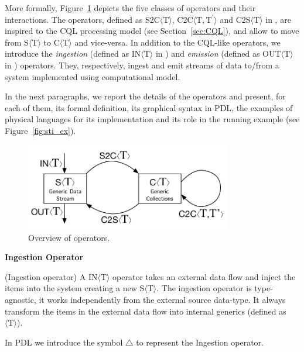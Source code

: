 More formally, Figure~\ref{fig:cm-op} depicts the five classes of \river{} operators and their interactions. 
The operators, defined as S2C$\langle\mathrm{T}\rangle$, C2C$\langle\mathrm{T},\mathrm{T^{\prime}}\rangle$ and C2S$\langle\mathrm{T}\rangle$ in \river{}, are inspired to the CQL processing model (see Section~\ref{sec:CQL}), and allow to move from S$\langle\mathrm{T}\rangle$ to C$\langle\mathrm{T}\rangle$ and vice-versa.
In addition to the CQL-like operators, we introduce the \textit{ingestion} (defined as IN$\langle\mathrm{T}\rangle$ in \river{}) and \textit{emission} (defined as OUT$\langle\mathrm{T}\rangle$ in \river{}) operators.
They, respectively, ingest and emit streams of data to/from a system implemented using \river{} computational model.

In the next paragraphs, we report the details of the operators and present, for each of them, its formal definition, its graphical syntax in PDL, the examples of physical languages for its implementation and its role in the running example (see Figure~\ref{fig:sti_ex}).

\begin{figure}[t]
    \centering
    \includegraphics[width=0.8\textwidth]{img/computational-model-operators}
    \caption{Overview of \textnormal{\protect\river{}} operators.}
    \label{fig:cm-op}
\end{figure}

\medskip
\noindent
\textbf{Ingestion Operator}
\medskip

\begin{Definition}
(Ingestion operator) A IN$\langle\mathrm{T}\rangle$ operator takes an external data flow and inject the items into the system creating a new S$\langle\mathrm{T}\rangle$. 
The ingestion operator is type-agnostic, it works independently from the external source data-type.
It always transform the items in the external data flow into internal generics (defined as $\langle\mathrm{T}\rangle$).
\end{Definition}

\noindent
In PDL we introduce the symbol $\bigtriangleup$ to represent the Ingestion operator.

